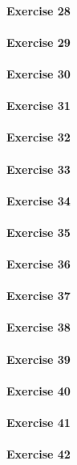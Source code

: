 \paragraph{Exercise 28}
\paragraph{Exercise 29}
\paragraph{Exercise 30}
\paragraph{Exercise 31}
\paragraph{Exercise 32}
\paragraph{Exercise 33}
\paragraph{Exercise 34}
\paragraph{Exercise 35}
\paragraph{Exercise 36}
\paragraph{Exercise 37}
\paragraph{Exercise 38}
\paragraph{Exercise 39}
\paragraph{Exercise 40}
\paragraph{Exercise 41}
\paragraph{Exercise 42}
